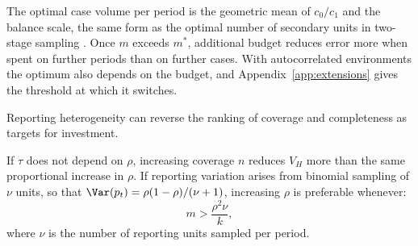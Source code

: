 The optimal case volume per period is the geometric mean of $c_0/c_1$ and the balance scale, the same form as the optimal number of secondary units in two-stage sampling \citep{cochran1977sampling}. Once $m$ exceeds $m^*$, additional budget reduces error more when spent on further periods than on further cases. With autocorrelated environments the optimum also depends on the budget, and Appendix~\ref{app:extensions} gives the threshold at which it switches.

Reporting heterogeneity can reverse the ranking of coverage and completeness as targets for investment.

\begin{corollary}
\label{cor:switch}
If $\tau$ does not depend on $\rho$, increasing coverage $n$ reduces $V_H$ more than the same proportional increase in $\rho$. If reporting variation arises from binomial sampling of $\nu$ units, so that $\Var(p_t)=\rho(1-\rho)/(\nu+1)$, increasing $\rho$ is preferable whenever:
\begin{equation}
  m>\frac{\rho^2\nu}{k},
  \label{eq:r3-switch}
\end{equation}
where $\nu$ is the number of reporting units sampled per period.
\end{corollary}
